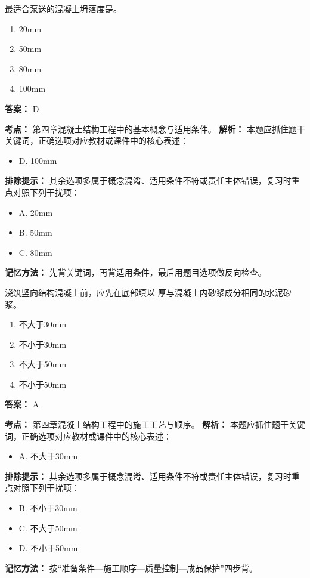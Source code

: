\documentclass[UTF8,fontset=fandol,11pt]{ctexart}
\begin{document}
\vspace{0.2em}

\begin{quizbox}[title={第 71 题}]
最适合泵送的混凝土坍落度是。\\
\begin{enumerate}[label=\Alph*.]
\item 20mm
\item 50mm
\item 80mm
\item 100mm
\end{enumerate}
\textbf{答案：} D
\vspace{0.25em}
\begin{answerbox}[title={考点解析}]
\textbf{考点：} 第四章混凝土结构工程中的基本概念与适用条件。
\textbf{解析：} 本题应抓住题干关键词，正确选项对应教材或课件中的核心表述：
\begin{itemize}
\item D. 100mm
\end{itemize}
\textbf{排除提示：} 其余选项多属于概念混淆、适用条件不符或责任主体错误，复习时重点对照下列干扰项：
\begin{itemize}
\item A. 20mm
\item B. 50mm
\item C. 80mm
\end{itemize}
\textbf{记忆方法：} 先背关键词，再背适用条件，最后用题目选项做反向检查。
\end{answerbox}
\end{quizbox}

\vspace{0.2em}

\begin{quizbox}[title={第 72 题}]
浇筑竖向结构混凝土前，应先在底部填以 厚与混凝土内砂浆成分相同的水泥砂浆。\\
\begin{enumerate}[label=\Alph*.]
\item 不大于30mm
\item 不小于30mm
\item 不大于50mm
\item 不小于50mm
\end{enumerate}
\textbf{答案：} A
\vspace{0.25em}
\begin{answerbox}[title={考点解析}]
\textbf{考点：} 第四章混凝土结构工程中的施工工艺与顺序。
\textbf{解析：} 本题应抓住题干关键词，正确选项对应教材或课件中的核心表述：
\begin{itemize}
\item A. 不大于30mm
\end{itemize}
\textbf{排除提示：} 其余选项多属于概念混淆、适用条件不符或责任主体错误，复习时重点对照下列干扰项：
\begin{itemize}
\item B. 不小于30mm
\item C. 不大于50mm
\item D. 不小于50mm
\end{itemize}
\textbf{记忆方法：} 按“准备条件—施工顺序—质量控制—成品保护”四步背。
\end{answerbox}
\end{quizbox}
\end{document}
